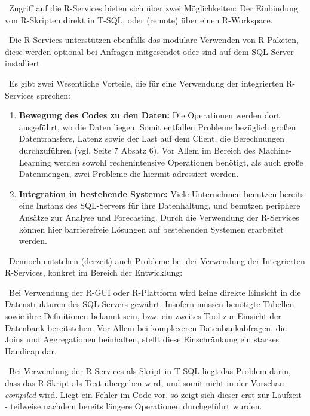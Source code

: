 ~\newline Zugriff auf die R-Services bieten sich über zwei Möglichkeiten: Der Einbindung von R-Skripten direkt in T-SQL, oder (remote) über einen R-Workspace. 

~\newline Die R-Services unterstützen ebenfalls das modulare Verwenden von R-Paketen, diese werden optional bei Anfragen mitgesendet oder sind auf dem SQL-Server installiert. 

~\newline Es gibt zwei Wesentliche Vorteile, die für eine Verwendung der integrierten R-Services sprechen:

\begin{enumerate}
	\item \textbf{Bewegung des Codes zu den Daten:} Die Operationen werden dort ausgeführt, wo die Daten liegen. Somit entfallen Probleme bezüglich großen Datentransfers, Latenz sowie der Last auf dem Client, die Berechnungen durchzuführen (vgl. \cite{SQLData} Seite 7 Absatz 6). Vor Allem im Bereich des Machine-Learning werden sowohl rechenintensive Operationen benötigt, als auch große Datenmengen, zwei Probleme die hiermit adressiert werden. 
	\item \textbf{Integration in bestehende Systeme:} Viele Unternehmen benutzen bereits eine Instanz des SQL-Servers für ihre Datenhaltung, und benutzen periphere Ansätze zur Analyse und Forecasting. Durch die Verwendung der R-Services können hier barrierefreie Lösungen auf bestehenden Systemen erarbeitet werden. 
\end{enumerate}

~\newline Dennoch entstehen (derzeit) auch Probleme bei der Verwendung der Integrierten R-Services, konkret im Bereich der Entwicklung: 

~\newline Bei Verwendung der R-GUI oder R-Plattform wird keine direkte Einsicht in die Datenstrukturen des SQL-Servers gewährt. Insofern müssen benötigte Tabellen sowie ihre Definitionen bekannt sein, bzw. ein zweites Tool zur Einsicht der Datenbank bereitstehen. Vor Allem bei komplexeren Datenbankabfragen, die Joins und Aggregationen beinhalten, stellt diese Einschränkung ein starkes Handicap dar. 

~\newline Bei Verwendung der R-Services als Skript in T-SQL liegt das Problem darin, dass das R-Skript als Text übergeben wird, und somit nicht in der Vorschau \textit{compiled} wird. Liegt ein Fehler im Code vor, so zeigt sich dieser erst zur Laufzeit - teilweise nachdem bereits längere Operationen durchgeführt wurden. 

